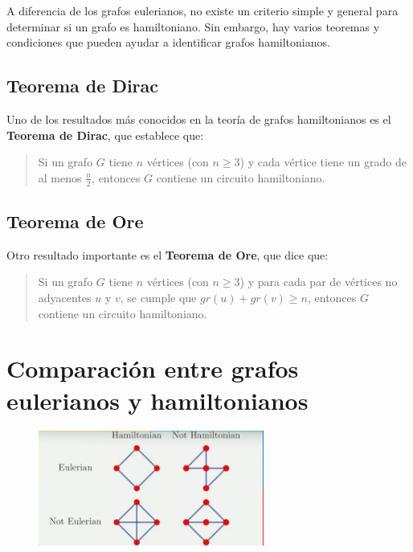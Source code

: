 \documentclass{article}
\begin{document}
A diferencia de los grafos eulerianos, no existe un criterio simple y general para determinar si un grafo es hamiltoniano. Sin embargo, hay varios teoremas y condiciones que pueden ayudar a identificar grafos hamiltonianos.

\subsection{Teorema de Dirac}

Uno de los resultados más conocidos en la teoría de grafos hamiltonianos es el \textbf{Teorema de Dirac}, que establece que:

\begin{quote}
Si un grafo $ G $ tiene $ n $ vértices (con $ n \geq 3 $) y cada vértice tiene un grado de al menos $ \frac{n}{2} $, entonces $ G $ contiene un circuito hamiltoniano.
\end{quote}

\subsection{Teorema de Ore}

Otro resultado importante es el \textbf{Teorema de Ore}, que dice que:

\begin{quote}
Si un grafo $ G $ tiene $ n $ vértices (con $ n \geq 3 $) y para cada par de vértices no adyacentes $ u $ y $ v $, se cumple que $ gr(u) + gr(v) \geq n $, entonces $ G $ contiene un circuito hamiltoniano.
\end{quote}

\section{Comparación entre grafos eulerianos y hamiltonianos}

\begin{figure}[h]
    \centering
    \includegraphics[width=0.66\textwidth]{img-t4/img_413_47.png}
\end{figure}
\end{document}
